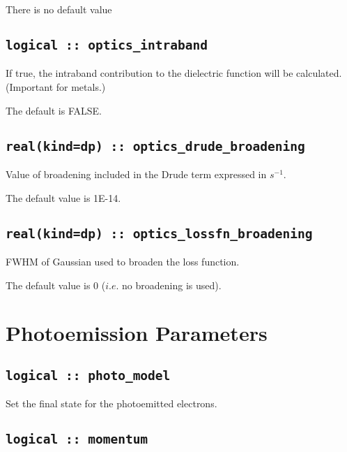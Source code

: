 \documentclass[a4paper,11pt,twoside]{book}
\begin{document}
There is no default value

\subsection[optics\_intraband]{\tt logical :: optics\_intraband}
If true, the intraband contribution to the dielectric function will be calculated.  (Important for metals.)    

The default is FALSE.

\subsection[optics\_drude\_broadening]{\tt real(kind=dp) :: optics\_drude\_broadening}
Value of broadening included in the Drude term expressed in $s^{-1}$.  

The default value is 1E-14.  

\subsection[optics\_lossfn\_broadening]{\tt real(kind=dp) :: optics\_lossfn\_broadening}
FWHM of Gaussian used to broaden the loss function.  

The default value is 0 ($i.e.$ no broadening is used).  

\section{Photoemission Parameters}

\subsection[photo\_model]{\tt logical :: photo\_model}

Set the final state for the photoemitted electrons.


\subsection[momentum]{\tt logical :: momentum}
\end{document}
